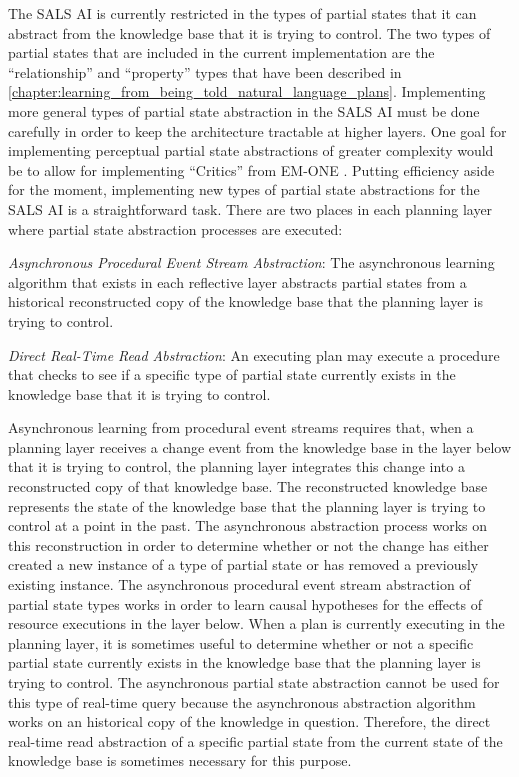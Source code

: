 The SALS AI is currently restricted in the types of partial states
that it can abstract from the knowledge base that it is trying to
control.  The two types of partial states that are included in the
current implementation are the ``relationship'' and ``property'' types
that have been described in
{\mbox{\autoref{chapter:learning_from_being_told_natural_language_plans}}}.
Implementing more general types of partial state abstraction in the
SALS AI must be done carefully in order to keep the architecture
tractable at higher layers.  One goal for implementing perceptual
partial state abstractions of greater complexity would be to allow for
implementing ``Critics'' from EM-ONE \cite[]{singh:2005b}.  Putting
efficiency aside for the moment, implementing new types of partial
state abstractions for the SALS AI is a straightforward task.  There
are two places in each planning layer where partial state abstraction
processes are executed:
\begin{packed_enumerate}
\item{\emph{Asynchronous Procedural Event Stream Abstraction}: The
  asynchronous learning algorithm that exists in each reflective layer
  abstracts partial states from a historical reconstructed copy of the
  knowledge base that the planning layer is trying to control.}
\item{\emph{Direct Real-Time Read Abstraction}: An executing plan may
  execute a procedure that checks to see if a specific type of partial
  state currently exists in the knowledge base that it is trying to
  control.}
\end{packed_enumerate}
Asynchronous learning from procedural event streams requires that,
when a planning layer receives a change event from the knowledge base
in the layer below that it is trying to control, the planning layer
integrates this change into a reconstructed copy of that knowledge
base.  The reconstructed knowledge base represents the state of the
knowledge base that the planning layer is trying to control at a point
in the past.  The asynchronous abstraction process works on this
reconstruction in order to determine whether or not the change has
either created a new instance of a type of partial state or has
removed a previously existing instance.  The asynchronous procedural
event stream abstraction of partial state types works in order to
learn causal hypotheses for the effects of resource executions in the
layer below.  When a plan is currently executing in the planning
layer, it is sometimes useful to determine whether or not a specific
partial state currently exists in the knowledge base that the planning
layer is trying to control.  The asynchronous partial state
abstraction cannot be used for this type of real-time query because
the asynchronous abstraction algorithm works on an historical copy of
the knowledge in question.  Therefore, the direct real-time read
abstraction of a specific partial state from the current state of the
knowledge base is sometimes necessary for this purpose.


